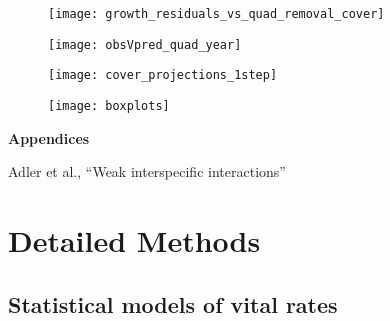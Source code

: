 \documentclass[11pt]{article}
\begin{document}
\begin{doublespacing}
 \clearpage
 \begin{figure}[tbp]
 \centering
 \texttt{[image: growth\_residuals\_vs\_quad\_removal\_cover]}
 \caption{}
 \label{fig:GrowthResidsQuad}
 \end{figure}
 
 \clearpage
  \begin{figure}[tbp]
  \centering
  \texttt{[image: obsVpred\_quad\_year]}
  \caption{}
  \label{fig:obsVpred}
  \end{figure}
  
  \clearpage
   \begin{figure}[tbp]
   \centering
   \texttt{[image: cover\_projections\_1step]}
   \caption{}
   \label{fig:IBM1step}
   \end{figure}
   
   \clearpage
    \begin{figure}[tbp]
    \centering
    \texttt{[image: boxplots]}
    \caption{}
    \label{fig:IPMresults}
    \end{figure}
    

\end{doublespacing} 


\clearpage 
\newpage 

\setcounter{page}{1}
\setcounter{equation}{0}
\setcounter{figure}{0}
\setcounter{section}{0}
\setcounter{table}{0}

\centerline{\Large \textbf{Appendices}}
\centerline{Adler et al., ``Weak interspecific interactions''} 

\vspace{0.4in} 

\renewcommand{\theequation}{A-\arabic{equation}}
\renewcommand{\thetable}{A-\arabic{table}}
\renewcommand{\thefigure}{A-\arabic{figure}}
\renewcommand{\thesection}{\Alph{section}}

\section{Detailed Methods} 
\label{AppendixA}

\subsection{Statistical models of vital rates}
\end{document}
